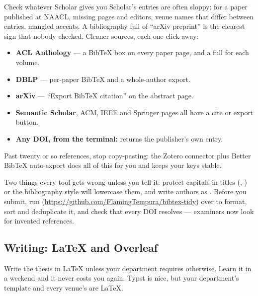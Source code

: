 \documentclass[11pt,a4paper]{article}
\begin{document}
\begin{wbox}{Check whatever Scholar gives you}
Scholar's entries are often sloppy:  for
a paper published at NAACL, missing pages and editors, venue names that differ
between entries, mangled accents. A bibliography full of ``arXiv preprint'' is
the clearest sign that nobody checked. Cleaner sources, each one click away:
\begin{itemize}
  \item \textbf{ACL Anthology} --- a BibTeX box on every paper page, and a
        full  for each volume.
  \item \textbf{DBLP} --- per-paper BibTeX and a whole-author export.
  \item \textbf{arXiv} --- ``Export BibTeX citation'' on the abstract page.
  \item \textbf{Semantic Scholar}, ACM, IEEE and Springer pages all have a
        cite or export button.
  \item \textbf{Any DOI, from the terminal:}
        returns the publisher's own entry.
\end{itemize}
\end{wbox}

Past twenty or so references, stop copy-pasting: the Zotero connector plus
Better BibTeX auto-export does all of this for you and keeps your keys stable.

Two things every tool gets wrong unless you tell it: protect capitals in
titles (, ) or the bibliography style will
lowercase them, and write authors as .
Before you submit, run 
(\url{https://github.com/FlamingTempura/bibtex-tidy}) over 
to format, sort and deduplicate it, and check that every DOI resolves ---
examiners now look for invented references.

\subsection{Writing: LaTeX and Overleaf}

Write the thesis in LaTeX unless your department requires otherwise. Learn it
in a weekend and it never costs you again. Typst is nice, but your
department's template and every venue's are LaTeX.
\end{document}
